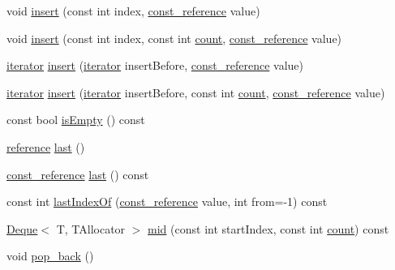 \begin{DoxyCompactItemize}
void \hyperlink{classprism_1_1_deque_a915f9b6aa4549701d319c078d465c6f1}{insert} (const int index, \hyperlink{classprism_1_1_deque_affa26df70d5123f79a59386056e920c3}{const\+\_\+reference} value)
\item 
void \hyperlink{classprism_1_1_deque_ae9f5af22defad53952b2bf3f2d0ea1c8}{insert} (const int index, const int \hyperlink{classprism_1_1_deque_afbd3bd892ee68247cb75a7bfb8b168e2}{count}, \hyperlink{classprism_1_1_deque_affa26df70d5123f79a59386056e920c3}{const\+\_\+reference} value)
\item 
\hyperlink{classprism_1_1_deque_a263fd8daf307719cd101c97028fe68a1}{iterator} \hyperlink{classprism_1_1_deque_a3c516c158e0de1a543bbbc581fd0cd54}{insert} (\hyperlink{classprism_1_1_deque_a263fd8daf307719cd101c97028fe68a1}{iterator} insert\+Before, \hyperlink{classprism_1_1_deque_affa26df70d5123f79a59386056e920c3}{const\+\_\+reference} value)
\item 
\hyperlink{classprism_1_1_deque_a263fd8daf307719cd101c97028fe68a1}{iterator} \hyperlink{classprism_1_1_deque_ae56df006dd5f795817ef3b715a232b14}{insert} (\hyperlink{classprism_1_1_deque_a263fd8daf307719cd101c97028fe68a1}{iterator} insert\+Before, const int \hyperlink{classprism_1_1_deque_afbd3bd892ee68247cb75a7bfb8b168e2}{count}, \hyperlink{classprism_1_1_deque_affa26df70d5123f79a59386056e920c3}{const\+\_\+reference} value)
\item 
const bool \hyperlink{classprism_1_1_deque_a37fbed8a2b810f251a4381b50a2f15dc}{is\+Empty} () const 
\item 
\hyperlink{classprism_1_1_deque_a035cdb869f46870d62d403d9ff5e3691}{reference} \hyperlink{classprism_1_1_deque_a2ee25a04680e547ae11c165a087e6806}{last} ()
\item 
\hyperlink{classprism_1_1_deque_affa26df70d5123f79a59386056e920c3}{const\+\_\+reference} \hyperlink{classprism_1_1_deque_a4d19340d733fb878b86ad6ac2f2554d9}{last} () const 
\item 
const int \hyperlink{classprism_1_1_deque_a654016a092e317b6281819635af4d4db}{last\+Index\+Of} (\hyperlink{classprism_1_1_deque_affa26df70d5123f79a59386056e920c3}{const\+\_\+reference} value, int from=-\/1) const 
\item 
\hyperlink{classprism_1_1_deque}{Deque}$<$ T, T\+Allocator $>$ \hyperlink{classprism_1_1_deque_ab6d73340eb546ce62b86fd0a6bab6d01}{mid} (const int start\+Index, const int \hyperlink{classprism_1_1_deque_afbd3bd892ee68247cb75a7bfb8b168e2}{count}) const 
\item 
void \hyperlink{classprism_1_1_deque_a78321ac88433e61fdb05728e0939c94a}{pop\+\_\+back} ()

\end{DoxyCompactItemize}
